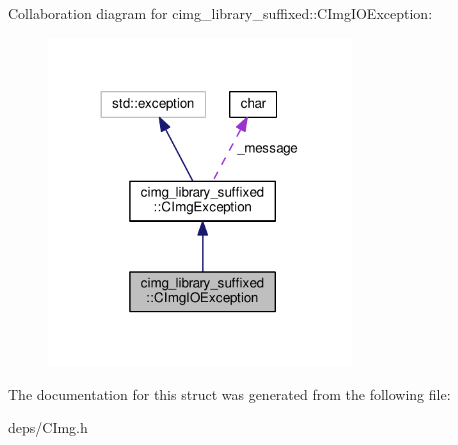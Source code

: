 Collaboration diagram for cimg\+\_\+library\+\_\+suffixed\+:\+:C\+Img\+I\+O\+Exception\+:
\nopagebreak
\begin{figure}[H]
\begin{center}
\leavevmode
\includegraphics[width=228pt]{d7/db1/structcimg__library__suffixed_1_1CImgIOException__coll__graph}
\end{center}
\end{figure}


The documentation for this struct was generated from the following file\+:\begin{DoxyCompactItemize}
\item 
deps/C\+Img.\+h\end{DoxyCompactItemize}
